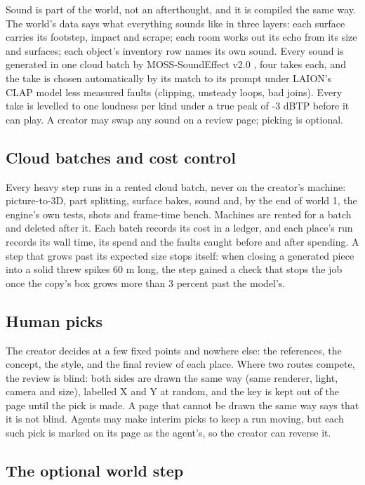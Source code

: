 Sound is part of the world, not an afterthought, and it is compiled the same way. The world's data says what everything sounds like in three layers: each surface carries its footstep, impact and scrape; each room works out its echo from its size and surfaces; each object's inventory row names its own sound. Every sound is generated in one cloud batch by MOSS-SoundEffect v2.0 \citep{moss2026}, four takes each, and the take is chosen automatically by its match to its prompt under LAION's CLAP model \citep{wu2022clap} less measured faults (clipping, unsteady loops, bad joins). Every take is levelled to one loudness per kind under a true peak of -3 dBTP before it can play. A creator may swap any sound on a review page; picking is optional.

\subsection{Cloud batches and cost control}\label{cloud-batches-and-cost-control}

Every heavy step runs in a rented cloud batch, never on the creator's machine: picture-to-3D, part splitting, surface bakes, sound and, by the end of world 1, the engine's own tests, shots and frame-time bench. Machines are rented for a batch and deleted after it. Each batch records its cost in a ledger, and each place's run records its wall time, its spend and the faults caught before and after spending. A step that grows past its expected size stops itself: when closing a generated piece into a solid threw spikes 60 m long, the step gained a check that stops the job once the copy's box grows more than 3 percent past the model's.

\subsection{Human picks}\label{human-picks}

The creator decides at a few fixed points and nowhere else: the references, the concept, the style, and the final review of each place. Where two routes compete, the review is blind: both sides are drawn the same way (same renderer, light, camera and size), labelled X and Y at random, and the key is kept out of the page until the pick is made. A page that cannot be drawn the same way says that it is not blind. Agents may make interim picks to keep a run moving, but each such pick is marked on its page as the agent's, so the creator can reverse it.

\subsection{The optional world step}\label{the-optional-world-step}

